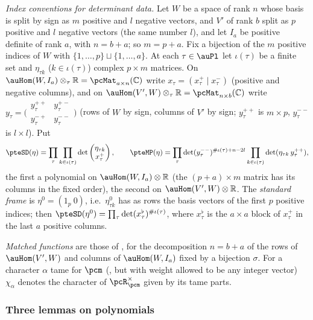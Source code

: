 \documentclass[10pt]{amsart}
\theoremstyle{definition}
\theoremstyle{remark}
\newcommand{\C}{\mathbb C}
\newcommand{\R}{\mathbb R}
\begin{document}
\emph{Index conventions for determinant data.} Let $W$ be a space of rank $n$ whose basis is split by
sign as $m$ positive and $l$ negative vectors, and $V'$ of rank $b$ split as $p$ positive and $l$
negative vectors (the same number $l$), and let $I_a$ be positive definite of rank $a$, with
$n=b+a$; so $m=p+a$. Fix a bijection of the $m$ positive indices of $W$ with $\{1,\dots,p\}\sqcup
\{1,\dots,a\}$. At each $\tau\in\auPl$ let $\iota(\tau)$ be a finite set and $\eta_{\tau k}$
($k\in\iota(\tau)$) complex $p\times m$ matrices. On $\auHom(W,I_a)\otimes_\tau\R=\pcMat_{a\times n}
(\C)$ write $x_\tau=(x^+_\tau\mid x^-_\tau)$ (positive and negative columns), and on
$\auHom(V',W)\otimes_\tau\R=\pcMat_{n\times b}(\C)$ write $y_\tau=\bigl(\begin{smallmatrix}
y^{++}_\tau&y^{+-}_\tau\\y^{-+}_\tau&y^{--}_\tau\end{smallmatrix}\bigr)$ (rows of $W$ by sign,
columns of $V'$ by sign; $y^{++}_\tau$ is $m\times p$, $y^{--}_\tau$ is $l\times l$). Put
\begin{equation}\label{pte:eq-SDMP}
\pteSD(\eta)=\prod_\tau\prod_{k\in\iota(\tau)}\det\begin{pmatrix}\eta_{\tau k}\\x^+_\tau
\end{pmatrix},\qquad
\pteMP(\eta)=\prod_\tau\det(y^{--}_\tau)^{\#\iota(\tau)+n-2l}\prod_{k\in\iota(\tau)}\det(\eta_{\tau
k}\,y^{++}_\tau),
\end{equation}
the first a polynomial on $\auHom(W,I_a)\otimes\R$ (the $(p+a)\times m$ matrix has its columns in the
fixed order), the second on $\auHom(V',W)\otimes\R$. The \emph{standard frame} is
$\eta^0=(1_p\ 0)$, i.e.\ $\eta^0_{\tau k}$ has as rows the basis vectors of the first $p$ positive
indices; then $\pteSD(\eta^0)=\prod_\tau\det(x^{\flat}_\tau)^{\#\iota(\tau)}$, where $x^\flat_\tau$ is the
$a\times a$ block of $x^+_\tau$ in the last $a$ positive columns.

\emph{Matched functions} are those of {\cite[Definition~3.1]{P53}}, for the decomposition
$n=b+a$ of the rows of $\auHom(V',W)$ and columns of $\auHom(W,I_a)$ fixed by a bijection $\sigma$.
For a character $\alpha$ tame for $\pcm$ ({\cite[\S3.1.1]{P53}}, but with weight allowed to be any
integer vector) $\chi_\alpha$ denotes the character of $\pcR_\pcm^\times$ given by its tame parts.

\subsubsection{Three lemmas on polynomials}\label{pte:ss-poly}
\end{document}
